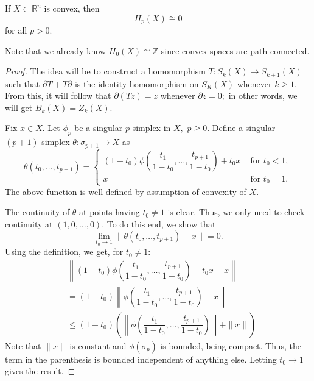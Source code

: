 \documentclass[12pt]{article}
\begin{document}
\begin{thm} \label{thm:convexsinghomologygroups}
	If $X \subset \mathbb{R}^n$ is convex, then
	\begin{equation*} 
		H_p(X) \cong 0
	\end{equation*}
	for all $p > 0.$
\end{thm}
Note that we already know $H_0(X)\cong\mathbb{Z}$ since convex spaces are path-connected.
\begin{proof} 
	The idea will be to construct a homomorphism $T:S_k(X) \to S_{k+1}(X)$ such that $\partial T + T\partial$ is the identity homomorphism on $S_K(X)$ whenever $k \ge 1.$ From this, it will follow that $\partial(Tz) = z$ whenever $\partial z = 0;$ in other words, we will get $B_k(X) = Z_k(X).$

	Fix $x \in X.$ Let $\phi_p$ be a singular $p$-simplex in $X,$ $p \ge 0.$ Define a singular $(p + 1)$-simplex $\theta:\sigma_{p+1}\to X$ as
	\begin{equation*} 
		\theta(t_0, \ldots, t_{p+1}) = \begin{cases}
			(1 - t_0)\phi\left(\dfrac{t_1}{1 - t_0}, \ldots, \dfrac{t_{p+1}}{1 - t_0}\right) + t_0x & \text{ for } t_0 < 1,\\
			x & \text{ for } t_0 = 1.
		\end{cases}
	\end{equation*}
	The above function is well-defined by assumption of convexity of $X.$

	The continuity of $\theta$ at points having $t_0 \neq 1$ is clear. Thus, we only need to check continuity at $(1, 0, \ldots, 0).$ To do this end, we show that
	\begin{equation*} 
		\lim_{t_0\to 1}\|\theta(t_0, \ldots, t_{p+1}) - x\| = 0.
	\end{equation*}
	Using the definition, we get, for $t_0 \neq 1:$
	\begin{align*} 
		& \left\|(1 - t_0)\phi\left(\dfrac{t_1}{1 - t_0}, \ldots, \dfrac{t_{p+1}}{1 - t_0}\right) + t_0x - x\right\|\\
		&= (1 - t_0)\left\|\phi\left(\dfrac{t_1}{1 - t_0}, \ldots, \dfrac{t_{p+1}}{1 - t_0}\right) - x\right\|\\
		& \le (1 - t_0)\left(\left\|\phi\left(\dfrac{t_1}{1 - t_0}, \ldots, \dfrac{t_{p+1}}{1 - t_0}\right)\right\| + \|x\|\right)
	\end{align*}
	Note that $\|x\|$ is constant and $\phi(\sigma_p)$ is bounded, being compact. Thus, the term in the parenthesis is bounded independent of anything else. Letting $t_0 \to 1$ gives the result.


\end{proof}
\end{document}
